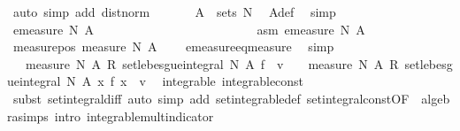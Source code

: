 \begin{isabellebody}
\ {\isacharparenleft}{\kern0pt}auto\ simp\ add{\isacharcolon}{\kern0pt}\ dist{\isacharunderscore}{\kern0pt}norm{\isacharparenright}{\kern0pt}\isanewline
\ \ \ \ \isamarkupfalse%
\ {\isacharasterisk}{\kern0pt}{\isacharcolon}{\kern0pt}\ {\isachardoublequoteopen}A\ {\isasymin}\ sets\ N{\isachardoublequoteclose}\ \isamarkupfalse%
\ A{\isacharunderscore}{\kern0pt}def\ \isamarkupfalse%
\ simp\isanewline
\ \ \ \ \isamarkupfalse%
\ {\isachardoublequoteopen}emeasure\ N\ A\ {\isacharequal}{\kern0pt}\ {}{\isachardoublequoteclose}\ \isanewline
\ \ \ \ \isamarkupfalse%
\ {\isacharminus}{\kern0pt}\isanewline
\ \ \ \ \ \ \isacommand{{\isacharbraceleft}{\kern0pt}}\isamarkupfalse%
\isanewline
\ \ \ \ \ \ \ \ \isamarkupfalse%
\ asm{\isacharcolon}{\kern0pt}\ {\isachardoublequoteopen}emeasure\ N\ A\ {\isachargreater}{\kern0pt}\ {}{\isachardoublequoteclose}\isanewline
\ \ \ \ \ \ \ \ \isamarkupfalse%
\ measure{\isacharunderscore}{\kern0pt}pos{\isacharcolon}{\kern0pt}\ {\isachardoublequoteopen}measure\ N\ A\ {\isachargreater}{\kern0pt}\ {}{\isachardoublequoteclose}\ \isamarkupfalse%
\ emeasure{\isacharunderscore}{\kern0pt}eq{\isacharunderscore}{\kern0pt}measure\ \isamarkupfalse%
\ simp\isanewline
\ \ \ \ \ \ \ \ \isamarkupfalse%
\ {\isachardoublequoteopen}{\isacharparenleft}{\kern0pt}{}\ {\isacharslash}{\kern0pt}\ measure\ N\ A{\isacharparenright}{\kern0pt}\ {\isacharasterisk}{\kern0pt}\isactrlsub R\ set{\isacharunderscore}{\kern0pt}lebesgue{\isacharunderscore}{\kern0pt}integral\ N\ A\ f\ {\isacharminus}{\kern0pt}\ v\ {\isacharequal}{\kern0pt}\ {\isacharparenleft}{\kern0pt}{}\ {\isacharslash}{\kern0pt}\ measure\ N\ A{\isacharparenright}{\kern0pt}\ {\isacharasterisk}{\kern0pt}\isactrlsub R\ set{\isacharunderscore}{\kern0pt}lebesgue{\isacharunderscore}{\kern0pt}integral\ N\ A\ {\isacharparenleft}{\kern0pt}{\isasymlambda}x{\isachardot}{\kern0pt}\ f\ x\ {\isacharminus}{\kern0pt}\ v{\isacharparenright}{\kern0pt}{\isachardoublequoteclose}\ \isamarkupfalse%
\ integrable\ integrable{\isacharunderscore}{\kern0pt}const\ {\isacharasterisk}{\kern0pt}\ \isamarkupfalse%
\ {\isacharparenleft}{\kern0pt}subst\ set{\isacharunderscore}{\kern0pt}integral{\isacharunderscore}{\kern0pt}diff{\isacharparenleft}{\kern0pt}{}{\isacharparenright}{\kern0pt}{\isacharcomma}{\kern0pt}\ auto\ simp\ add{\isacharcolon}{\kern0pt}\ set{\isacharunderscore}{\kern0pt}integrable{\isacharunderscore}{\kern0pt}def\ set{\isacharunderscore}{\kern0pt}integral{\isacharunderscore}{\kern0pt}const{\isacharbrackleft}{\kern0pt}OF\ {\isacharasterisk}{\kern0pt}{\isacharbrackright}{\kern0pt}\ algebra{\isacharunderscore}{\kern0pt}simps\ intro{\isacharbang}{\kern0pt}{\isacharcolon}{\kern0pt}\ integrable{\isacharunderscore}{\kern0pt}mult{\isacharunderscore}{\kern0pt}indicator{\isacharparenright}{\kern0pt}\isanewline

\end{isabellebody}
